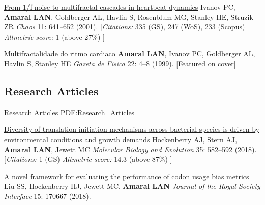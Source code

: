 \NumberedItem{\makebox[0.8cm][r]{[2]}}
\href{/people/amaral/from-1f-noise-to-multifractal-cascades-in-heartbeat-dynamics}
{From 1/f noise to multifractal cascades in heartbeat dynamics}
\newline
Ivanov PC, {\textbf{Amaral LAN}}, Goldberger AL, Havlin S, Rosenblum MG, Stanley HE, Struzik ZR
\newline
\textit{Chaos}
    11:
641--652 (2001).
    \newline
    \hfill [{\em{Citations:}} 335 (GS),
    247 (WoS), 233 (Scopus)
        {\hspace*{1cm} \em{Altmetric score:}}  1 (above 27\%)
    ]
\newline
\Gap
~
\Gap

\NumberedItem{\makebox[0.8cm][r]{[1]}}
\href{False}
{Multifractalidade do ritmo cardiaco}
\newline
{\textbf{Amaral LAN}}, Ivanov PC, Goldberger AL, Havlin S, Stanley HE 
\newline
\textit{Gazeta de Fisica }
    22:
4--8  (1999).
    [Featured on cover]
\newline
\Gap
~
\Gap

\vspace*{0.2cm}\subsection
{Research Articles}
{Research Articles}
{PDF:Research_Articles}

\GapNoBreak
\NumberedItem{\makebox[0.8cm][r]{[124]}}
\href{/people/amaral/diversity-translation-initiation-mechanisms-across-bacterial-species-driven-environmental-conditions-and-growth-demands/}
{Diversity of translation initiation mechanisms across bacterial species is driven by environmental conditions and growth demands }
\newline
Hockenberry AJ, Stern AJ, {\textbf{Amaral LAN}}, Jewett MC
\newline
\textit{Molecular Biology and Evolution}
    35:
582--592 (2018).
    \newline
    \hfill [{\em{Citations:}} 1 (GS)
        {\hspace*{1cm} \em{Altmetric score:}}  14.3 (above 87\%)
    ]
\newline
\Gap
~
\Gap

\NumberedItem{\makebox[0.8cm][r]{[123]}}
\href{/people/amaral/novel-framework-evaluating-performance-codon-usage-bias-metrics/}
{A novel framework for evaluating the performance of codon usage bias metrics}
\newline
Liu SS, Hockenberry HJ, Jewett MC, {\textbf{Amaral LAN}}
\newline
\textit{Journal of the Royal Society Interface}
    15:
170667 (2018).
\newline
\Gap
~
\Gap

